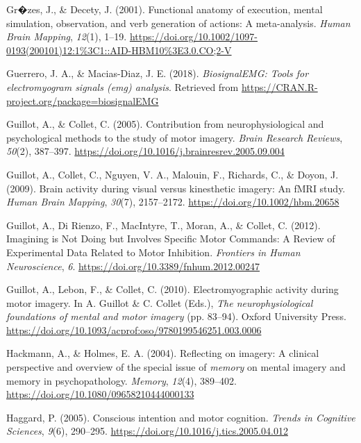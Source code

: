 \documentclass[a4paper,12pt,twoside,openright,oldfontcommands]{memoir}
\begin{document}
\leavevmode\hypertarget{ref-grzes_functional_2001}{}%
Gr�zes, J., \& Decety, J. (2001). Functional anatomy of execution, mental simulation, observation, and verb generation of actions: A meta-analysis. \emph{Human Brain Mapping}, \emph{12}(1), 1--19. \url{https://doi.org/10.1002/1097-0193(200101)12:1\%3C1::AID-HBM10\%3E3.0.CO;2-V}

\leavevmode\hypertarget{ref-R-biosignalEMG}{}%
Guerrero, J. A., \& Macias-Diaz, J. E. (2018). \emph{BiosignalEMG: Tools for electromyogram signals (emg) analysis}. Retrieved from \url{https://CRAN.R-project.org/package=biosignalEMG}

\leavevmode\hypertarget{ref-guillot_contribution_2005}{}%
Guillot, A., \& Collet, C. (2005). Contribution from neurophysiological and psychological methods to the study of motor imagery. \emph{Brain Research Reviews}, \emph{50}(2), 387--397. \url{https://doi.org/10.1016/j.brainresrev.2005.09.004}

\leavevmode\hypertarget{ref-guillot_brain_2009}{}%
Guillot, A., Collet, C., Nguyen, V. A., Malouin, F., Richards, C., \& Doyon, J. (2009). Brain activity during visual versus kinesthetic imagery: An fMRI study. \emph{Human Brain Mapping}, \emph{30}(7), 2157--2172. \url{https://doi.org/10.1002/hbm.20658}

\leavevmode\hypertarget{ref-guillot_imagining_2012}{}%
Guillot, A., Di Rienzo, F., MacIntyre, T., Moran, A., \& Collet, C. (2012). Imagining is Not Doing but Involves Specific Motor Commands: A Review of Experimental Data Related to Motor Inhibition. \emph{Frontiers in Human Neuroscience}, \emph{6}. \url{https://doi.org/10.3389/fnhum.2012.00247}

\leavevmode\hypertarget{ref-guillot_electromyographic_2010}{}%
Guillot, A., Lebon, F., \& Collet, C. (2010). Electromyographic activity during motor imagery. In A. Guillot \& C. Collet (Eds.), \emph{The neurophysiological foundations of mental and motor imagery} (pp. 83--94). Oxford University Press. \url{https://doi.org/10.1093/acprof:oso/9780199546251.003.0006}

\leavevmode\hypertarget{ref-hackmann_reflecting_2004}{}%
Hackmann, A., \& Holmes, E. A. (2004). Reflecting on imagery: A clinical perspective and overview of the special issue of \emph{memory} on mental imagery and memory in psychopathology. \emph{Memory}, \emph{12}(4), 389--402. \url{https://doi.org/10.1080/09658210444000133}

\leavevmode\hypertarget{ref-haggard_conscious_2005}{}%
Haggard, P. (2005). Conscious intention and motor cognition. \emph{Trends in Cognitive Sciences}, \emph{9}(6), 290--295. \url{https://doi.org/10.1016/j.tics.2005.04.012}
\end{document}
